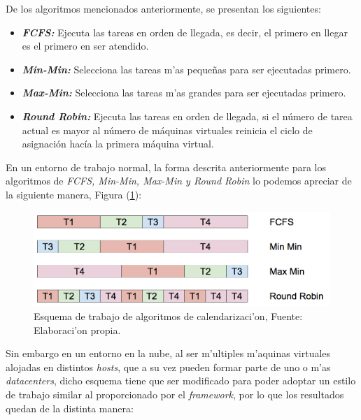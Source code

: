 De los algoritmos mencionados anteriormente, se presentan los siguientes:


\begin{itemize}
	\item \textit{\textbf{FCFS:}} Ejecuta las tareas en orden de llegada, es decir, el primero en llegar es el primero en ser atendido.
	\item \textit{\textbf{Min-Min:}} Selecciona las tareas m'as pequeñas para ser ejecutadas primero.
	\item  \textit{\textbf{Max-Min:}} Selecciona las tareas m'as grandes para ser ejecutadas primero.
	\item \textit{\textbf{Round Robin:}} Ejecuta las tareas en orden de llegada, si el número de tarea actual es mayor al número de máquinas virtuales reinicia el ciclo de asignación hacía la primera máquina virtual.
\end{itemize}

En un entorno de trabajo normal, la forma descrita anteriormente para los algoritmos de \textit{FCFS, Min-Min, Max-Min y Round Robin} lo podemos apreciar de la siguiente manera, Figura (\ref{fig:cuatro}):


\renewcommand\thefigure{\arabic{figure}}
\begin{figure}[H]
	\centering
	\includegraphics[scale=0.4]{media/NuevoEsquema}
	\caption{Esquema de trabajo de algoritmos de calendarizaci'on, Fuente: Elaboraci'on propia.}
	\label{fig:cuatro}
\end{figure}


Sin embargo en un entorno en la nube, al ser m'ultiples m'aquinas virtuales alojadas en distintos \textit{hosts}, que a su vez pueden formar parte de uno o m'as \textit{datacenters}, dicho esquema tiene que ser modificado para poder adoptar un estilo de trabajo similar al proporcionado por el \textit{framework}, por lo que los resultados quedan de la distinta manera:

